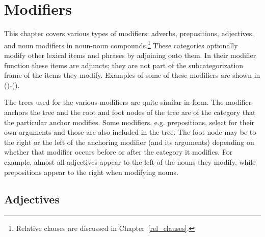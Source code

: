 \oddsidemargin 0.25in
\evensidemargin 0.25in
\topmargin 0in
\textheight 8.5in
\textwidth 6.25in
\newcommand{\xtagdef}[1]{{\sc #1}}
\newcommand{\xtagcheck}{$\surd$}

\setcounter{secnumdepth}{3}
\setcounter{tocdepth}{3}


\setcounter{bottomnumber}{20}
\setcounter{topnumber}{20}
\renewcommand{\bottomfraction}{1}
\renewcommand{\topfraction}{1}
\setcounter{totalnumber}{30}
\renewcommand{\textfraction}{0}
\renewcommand{\floatpagefraction}{0}

\pagestyle{plain}


\chapter{Modifiers}
\label{modifiers}

This chapter covers various types of modifiers: adverbs, prepositions,
adjectives, and noun modifiers in noun-noun compounds.\footnote{Relative
clauses are discussed in Chapter~\ref{rel_clauses}.}  These categories
optionally modify other lexical items and phrases by adjoining onto them.  In
their modifier function these items are adjuncts; they are not part of the
subcategorization frame of the items they modify.  Examples of some of these
modifiers are shown in ()-().




The trees used for the various modifiers are quite similar in form.
The modifier anchors the tree and the root and foot nodes of the tree
are of the category that the particular anchor modifies. Some
modifiers, e.g. prepositions, select for their own arguments and those
are also included in the tree.  The foot node may be to the right or
the left of the anchoring modifier (and its arguments) depending on
whether that modifier occurs before or after the category it
modifies. For example, almost all adjectives appear to the left of the
nouns they modify, while prepositions appear to the right when
modifying nouns.


\section{Adjectives}
\label{adj-modifier}

